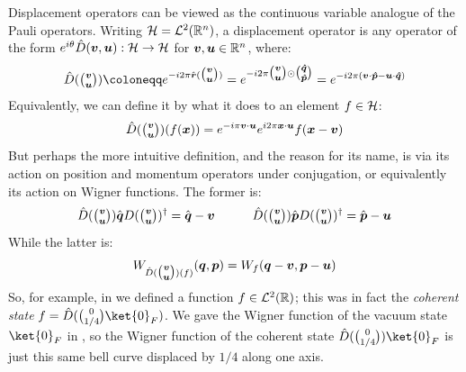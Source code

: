 Displacement operators can be viewed as the continuous variable analogue of the Pauli operators.
Writing $\mathcal{H} = \mathcal{L}^2(\mathbb{R}^n)$, a displacement operator is any operator of the form $e^{i\theta} \hat{D}(\boldsymbol{v}, \boldsymbol{u}): \mathcal{H} \to \mathcal{H}$ for $\boldsymbol{v}, \boldsymbol{u} \in \mathbb{R}^{n}$, where:
\begin{equation}\label{eq:displacement_defn}
    \hat{D}(\tbinom{\bsym{v}}{\bsym{u}})
    \coloneqq e^{-i2\pi \hat{\bsym{r}}(\tbinom{\boldsymbol{v}}{\boldsymbol{u}})}
    = e^{-i2\pi \tbinom{\bsym{v}}{\bsym{u}} \odot \tbinom{\bsym{\hat{q}}}{\bsym{\hat{p}}}}
    = e^{-i2\pi (\bsym{v} \cdot \bsym{\hat{p}} - \bsym{u} \cdot \bsym{\hat{q}})}
\end{equation}
Equivalently, we can define it by what it does to an element $f \in \mathcal{H}$:
\begin{equation}\label{eq:displacement_defn_action}
    \hat{D}(\tbinom{\boldsymbol{v}}{\boldsymbol{u}})(f(\boldsymbol{x})) = e^{-i\pi \boldsymbol{v} \cdot \boldsymbol{u}} e^{i2\pi \boldsymbol{x} \cdot \boldsymbol{u}} f(\boldsymbol{x} - \boldsymbol{v})
\end{equation}
But perhaps the more intuitive definition, and the reason for its name, is via its action on position and momentum operators under conjugation, or equivalently its action on Wigner functions.
The former is:
\begin{equation}
    \hat{D}(\tbinom{\boldsymbol{v}}{\boldsymbol{u}}) \hat{\boldsymbol{q}} D(\tbinom{\boldsymbol{v}}{\boldsymbol{u}})^\dagger = \hat{\boldsymbol{q}} - \boldsymbol{v}
    \quad\qquad
    \hat{D}(\tbinom{\boldsymbol{v}}{\boldsymbol{u}}) \hat{\boldsymbol{p}} D(\tbinom{\boldsymbol{v}}{\boldsymbol{u}})^\dagger = \hat{\boldsymbol{p}} - \boldsymbol{u}
\end{equation}
While the latter is:
\begin{equation}
    W_{\hat{D}(\tbinom{\boldsymbol{v}}{\boldsymbol{u}})(f)}(\boldsymbol{q}, \boldsymbol{p}) = W_f(\boldsymbol{q} - \boldsymbol{v}, \boldsymbol{p} - \boldsymbol{u})
\end{equation}
So, for example, in  we defined a function $f \in \mathcal{L}^2(\mathbb{R})$; this was in fact the \textit{coherent state} $f = \hat{D}(\tbinom{0}{1/4}\ket{0}_F)$.
We gave the Wigner function of the vacuum state $\ket{0}_F$ in , so the Wigner function of the coherent state $\hat{D}(\tbinom{0}{1/4})\ket{0}_F$ is just this same bell curve displaced by $1/4$ along one axis.

